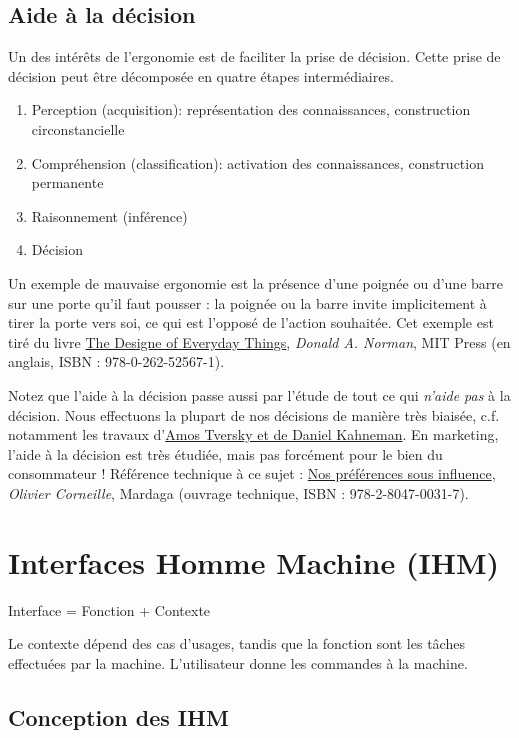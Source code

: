 \documentclass[10pt]{article}
\begin{document}
\subsection{Aide à la décision}

Un des intérêts de l'ergonomie est de faciliter la prise de décision. Cette prise de décision
peut être décomposée en quatre étapes intermédiaires.

\begin{enumerate}
\item{Perception (acquisition): représentation des connaissances, construction circonstancielle}
\item{Compréhension (classification): activation des connaissances, construction permanente}
\item{Raisonnement (inférence)}
\item{Décision}
\end{enumerate}

Un exemple de mauvaise ergonomie est la présence d'une poignée ou d'une barre sur une porte qu'il faut pousser :
la poignée ou la barre invite implicitement à tirer la porte vers soi, ce qui est l'opposé de l'action souhaitée.
Cet exemple est tiré du livre \underline{The Designe of Everyday Things}, \textit{Donald A. Norman}, MIT Press
(en anglais, ISBN : 978-0-262-52567-1).

Notez que l'aide à la décision passe aussi par l'étude de tout ce qui \emph{n'aide pas} à la décision.
Nous effectuons la plupart de nos décisions de manière très biaisée, c.f. notamment les travaux
d'\href{https://fr.wikipedia.org/wiki/Heuristique_de_jugement}{Amos Tversky et de Daniel Kahneman}.
En marketing, l'aide à la décision est très étudiée, mais pas forcément pour le bien du consommateur !
Référence technique à ce sujet : \underline{Nos préférences sous influence}, \textit{Olivier Corneille}, Mardaga
(ouvrage technique, ISBN : 978-2-8047-0031-7).


\section{Interfaces Homme Machine (IHM)}


Interface = Fonction + Contexte

Le contexte dépend des cas d'usages, tandis que la fonction sont les tâches effectuées
par la machine. L'utilisateur donne les commandes à la machine.

\subsection{Conception des IHM}
\end{document}
